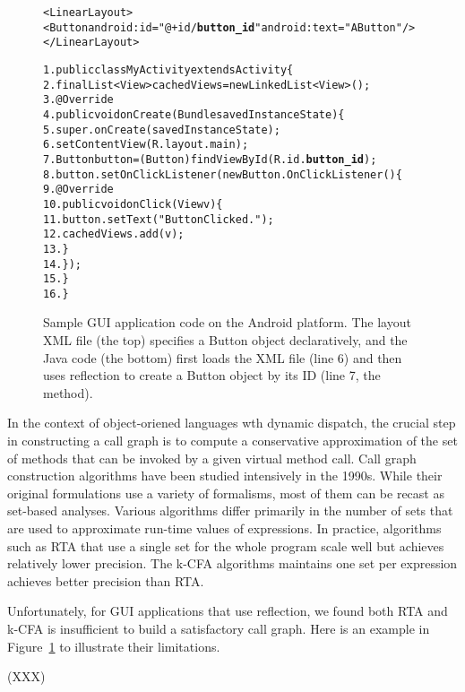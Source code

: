\begin{figure}[t]
\begin{CodeOut}
\begin{alltt}

<LinearLayout>
    <Button android:id="@+id/\textbf{button\_id}" android:text="A Button" />
</LinearLayout>

1. public class MyActivity extends Activity \{
2.    final List<View> cachedViews = new LinkedList<View>();
3.    @Override
4.    public void onCreate(Bundle savedInstanceState) \{
5.        super.onCreate(savedInstanceState);
6.        setContentView(R.layout.main);
7.        Button button = (Button) findViewById(R.id.\textbf{button\_id});
8.        button.setOnClickListener(new Button.OnClickListener() \{
9.            @Override
10.           public void onClick(View v) \{
11.               button.setText("Button Clicked.");
12.               cachedViews.add(v);
13.           \}
14.       \});
15.   \}
16. \}
\end{alltt}
\end{CodeOut}
\label{fig:sampleandroid}
\caption{Sample GUI application code on the Android platform. The layout
XML file (the top) specifies a Button object declaratively, 
and the Java code (the bottom)
first loads the XML file (line 6) and then uses reflection to create
a Button object by its ID (line 7, the  method).}
\end{figure}

In the context of object-oriened languages wth dynamic dispatch, the
crucial step in constructing a call graph is to compute a conservative
approximation of the set of methods that can be invoked by a given
virtual method call. Call graph construction algorithms have been
studied intensively in the 1990s. While their original formulations
use a variety of formalisms, most of them can be recast as set-based
analyses. Various algorithms differ primarily in the number of sets
that are used to approximate run-time values of expressions. 
In practice, algorithms such as RTA that use a single set for the whole
program scale well but achieves relatively lower precision. The
k-CFA algorithms maintains one set per expression achieves better
precision than RTA.

Unfortunately, for GUI applications that use reflection, we found both
RTA and k-CFA is insufficient to build a satisfactory call graph. Here
is an example in Figure~\ref{fig:sampleandroid} to illustrate their limitations.

(XXX)

